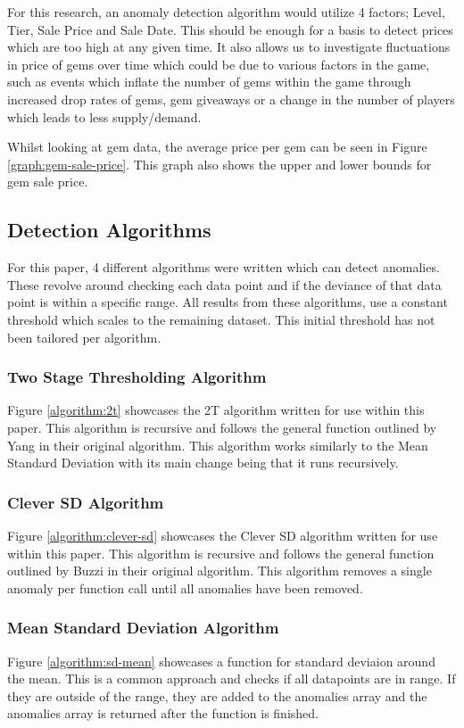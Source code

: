 \documentclass[journal]{IEEEtran}
\begin{document}
For this research, an anomaly detection algorithm would utilize 4 factors; Level, Tier, Sale Price and Sale Date. This should be enough for a basis to detect prices which are too high at any given time. It also allows us to investigate fluctuations in price of gems over time which could be due to various factors in the game, such as events which inflate the number of gems within the game through increased drop rates of gems, gem giveaways or a change in the number of players which leads to less supply/demand.

Whilst looking at gem data, the average price per gem can be seen in Figure \ref{graph:gem-sale-price}. This graph also shows the upper and lower bounds for gem sale price.

\subsection{Detection Algorithms}
For this paper, 4 different algorithms were written which can detect anomalies. These revolve around checking each data point and if the deviance of that data point is within a specific range. All results from these algorithms, use a constant threshold which scales to the remaining dataset. This initial threshold has not been tailored per algorithm.

\subsubsection{Two Stage Thresholding Algorithm}
Figure \ref{algorithm:2t} showcases the 2T algorithm written for use within this paper. This algorithm is recursive and follows the general function outlined by Yang\cite{Yang2019} in their original algorithm. This algorithm works similarly to the Mean Standard Deviation with its main change being that it runs recursively.

\subsubsection{Clever SD Algorithm}
Figure \ref{algorithm:clever-sd} showcases the Clever SD algorithm written for use within this paper. This algorithm is recursive and follows the general function outlined by Buzzi\cite{Buzzi2011} in their original algorithm. This algorithm removes a single anomaly per function call until all anomalies have been removed.

\subsubsection{Mean Standard Deviation Algorithm}
Figure \ref{algorithm:sd-mean} showcases a function for standard deviaion around the mean. This is a common approach and checks if all datapoints are in range. If they are outside of the range, they are added to the anomalies array and the anomalies array is returned after the function is finished.
\end{document}
